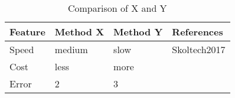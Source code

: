 \setlength{\tabcolsep}{0.5em} %
\renewcommand{\arraystretch}{2} %
\begin{table}[ht!]
  \centering
  \begin{tabularx}{0.9\textwidth}{|p{8em}|p{6em}p{6em}X|}
    \hline
    \textbf{Feature}     & \textbf{Method X}      & \textbf{Method Y}                           & \textbf{References}                      \\
    \hline
    \rowcolor[HTML]{EFEFEF}
    Speed                     &  medium     &  slow          &       Skoltech2017             \\
    \hline
    Cost                        & less            & more          &                                  \\
    \hline
    \rowcolor[HTML]{EFEFEF}
    Error                      &        2           &                   3                   &                                         \\
    \hline
  \end{tabularx}
    \caption{Comparison of X and Y}
    \label{tab:comparison_x_and_y}%
\end{table}